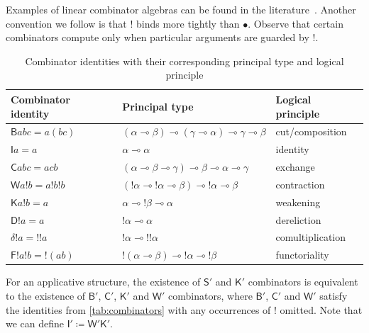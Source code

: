 \documentclass[a4paper,UKenglish,cleveref,numberwithinsect, autoref, thm-restate]{lipics-v2021}
\newcommand{\B}{\mathsf{B}}
\newcommand{\I}{\mathsf{I}}
\newcommand{\C}{\mathsf{C}}
\newcommand{\W}{\mathsf{W}}
\newcommand{\K}{\mathsf{K}}
\newcommand{\D}{\mathsf{D}}
\newcommand{\F}{\mathsf{F}}
\newcommand{\Scom}{\mathsf{S}}
\newcommand{\lin}{\multimap}
\newcommand{\expL}[1]{\mathbin{!} #1}
\begin{document}
Examples of linear combinator algebras can be found in the literature~\cite{AbramskyHaghverdiScott2002LCAs,hoshino:2007}.
Another convention we follow is that $!$ binds more tightly than $\bullet$. Observe that certain combinators compute only when particular arguments are guarded by $!$.
\begin{table}[t!]
    \centering
    \begin{tabular}{||l l l||} 
        \hline
        Combinator identity & Principal type & Logical principle \\ [0.5ex] 
        \hline\hline
        $\B abc=a(bc)$ & $(\alpha\lin\beta)\lin(\gamma\lin\alpha)\lin\gamma\lin\beta$ & cut/composition \\ 
        $\I a = a$ & $\alpha\lin\alpha$ & identity \\
        $\C abc = acb$ & $(\alpha\lin\beta\lin\gamma)\lin\beta\lin\alpha\lin\gamma$ & exchange \\
        $\W a!b = a!b!b$ & $(\expL{\alpha}\lin \expL{\alpha}\lin\beta)\lin \expL{\alpha}\lin\beta$ & contraction \\
        $\K a!b = a$ & $\alpha\lin \expL{\beta} \lin\alpha$ & weakening \\
        $\D!a = a$ & $\expL{\alpha} \lin\alpha$ & dereliction \\
        $\delta!a = !!a$ & $\expL{\alpha} \lin \expL{!\alpha}$ & comultiplication \\
        $\F!a!b = !(ab)$ & $\expL{(\alpha\lin\beta)}\lin \expL{\alpha}\lin\expL{\beta}$ & functoriality \\ [1ex] 
        \hline
    \end{tabular}
    \caption{Combinator identities with their corresponding principal type and logical principle}
    \label{tab:combinators}
\end{table}

For an applicative structure, the existence of $\Scom'$ and $\K'$ combinators is equivalent to the existence of $\B'$, $\C'$, $\K'$ and $\W'$ combinators, where $\B'$, $\C'$ and $\W'$ satisfy the identities from \autoref{tab:combinators} with any occurrences of $!$ omitted. Note that we can define $\I'\coloneqq \W'\K'$.
\end{document}
